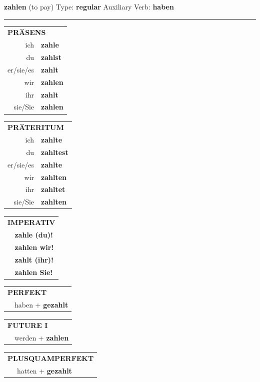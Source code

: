 \documentclass[10pt,a4paper]{revtex4-2}
\begin{document}
\begin{verbbox}
{\Large \bf zahlen} (to pay) \hfill Type: \textbf{regular} \hfill Auxiliary Verb: \textbf{haben}

\vspace{5pt}
\hrule
\vspace{5pt}

\begin{tabular}{rl}
\multicolumn{2}{l}{\textbf{PRÄSENS}}\\
ich & \textbf{zahle}\\
du & \textbf{zahlst}\\
er/sie/es & \textbf{zahlt}\\
wir & \textbf{zahlen}\\
ihr & \textbf{zahlt}\\
sie/Sie & \textbf{zahlen}\\
\end{tabular}
\hfill
\begin{tabular}{rl}
\multicolumn{2}{l}{\textbf{PRÄTERITUM}}\\
ich & \textbf{zahlte}\\
du & \textbf{zahltest}\\
er/sie/es & \textbf{zahlte}\\
wir & \textbf{zahlten}\\
ihr & \textbf{zahltet}\\
sie/Sie & \textbf{zahlten}\\
\end{tabular}
\hfill
\begin{tabular}{rl}
\multicolumn{2}{l}{\textbf{IMPERATIV}}\\
& \textbf{zahle (du)!}\\
& \textbf{zahlen wir!}\\
& \textbf{zahlt (ihr)!}\\
& \textbf{zahlen Sie!}\\
\end{tabular}

\vspace{10pt}

\begin{tabular}{rl}
\multicolumn{2}{l}{\textbf{PERFEKT}}\\
& haben + \textbf{gezahlt}\\
\end{tabular}
\hfill
\begin{tabular}{rl}
\multicolumn{2}{l}{\textbf{FUTURE I}}\\
& werden + \textbf{zahlen}\\
\end{tabular}
\hfill
\begin{tabular}{rl}
\multicolumn{2}{l}{\textbf{PLUSQUAMPERFEKT}}\\
& hatten + \textbf{gezahlt}\\
\end{tabular}


\end{verbbox}
\end{document}
